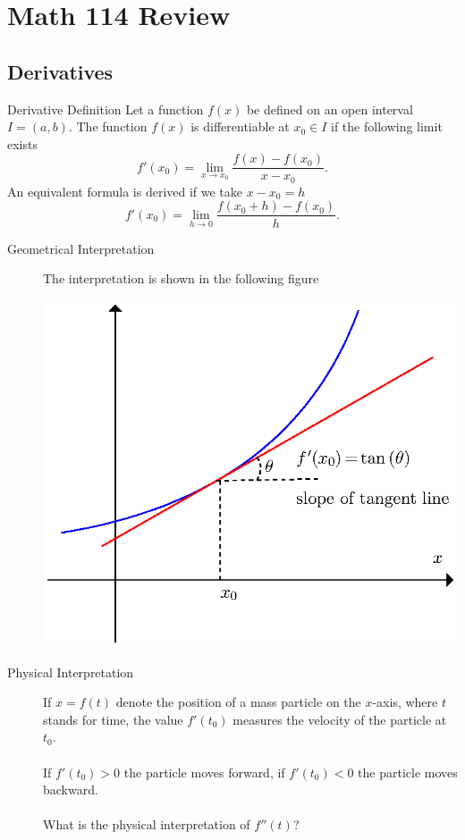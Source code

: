 \documentclass[letterpaper,10pt,twoside,twocolumn,openany]{book}
\begin{document}
\tableofcontents                        %
\mainmatter                             %

                        
\chapter{Math 114 Review}                %
\section{Derivatives}
\begin{DndSidebar}{Derivative Definition}
    Let a function $f ( x)$ be defined on an open interval $I = ( a, b)$. The function $f ( x)$ is differentiable at $x_0 \in I$ if the following limit exists
    \[ f' ( x_0) = \lim_{x \rightarrow x_0} \frac{f ( x) - f ( x_0)}{x - x_0} . \]
    An equivalent formula is derived if we take $x - x_0 = h$
    \[ f' ( x_0) = \lim_{h \rightarrow 0} \frac{f ( x_0 + h) - f ( x_0)}{h} . \]
\end{DndSidebar}


\begin{description}
    \item[Geometrical Interpretation] The interpretation is shown in the
    following figure
    
    \includegraphics[scale=0.83]{supplement-1.eps}
    
    \item[Physical Interpretation] If $x = f ( t)$ denote the position of a mass particle on the $x$-axis, where $t$ stands for time, the value $f' ( t_0)$ measures the velocity of the particle at $t_0$.
    \\~\\
    If $f' ( t_0) > 0$ the particle moves forward, if $f' ( t_0) < 0$ the particle moves backward.
    \\~\\
    What is the physical interpretation of $f'' ( t)$?
\end{description}
\newpage
\end{document}
